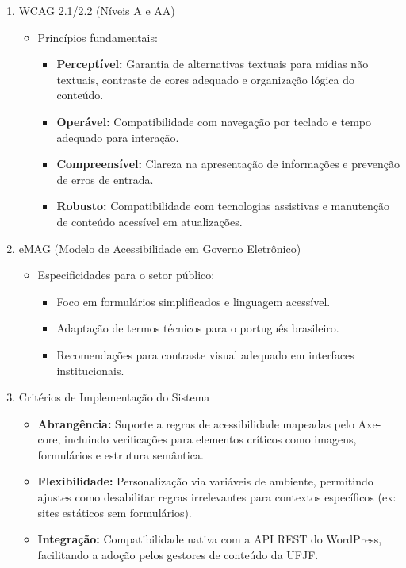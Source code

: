 \documentclass[12pt]{article}
\begin{document}
\begin{enumerate}
    \item WCAG 2.1/2.2 (Níveis A e AA)
    \begin{itemize}
        \item Princípios fundamentais: 
        \begin{itemize}
            \item \textbf{Perceptível:} Garantia de alternativas textuais para mídias não
            textuais, contraste de cores adequado e organização lógica do conteúdo.
            \item \textbf{Operável:} Compatibilidade com navegação por teclado e tempo
            adequado para interação.
            \item \textbf{Compreensível:} Clareza na apresentação de informações e
            prevenção de erros de entrada.
            \item \textbf{Robusto:} Compatibilidade com tecnologias assistivas e
            manutenção de conteúdo acessível em atualizações.
        \end{itemize}
    \end{itemize}
    \item eMAG (Modelo de Acessibilidade em Governo Eletrônico)
    \begin{itemize}
        \item Especificidades para o setor público:
        \begin{itemize}
            \item Foco em formulários simplificados e linguagem acessível.
            \item Adaptação de termos técnicos para o português brasileiro.
            \item Recomendações para contraste visual adequado em interfaces
            institucionais.
        \end{itemize}
    \end{itemize}
    \item Critérios de Implementação do Sistema
    \begin{itemize}
        \item \textbf{Abrangência:} Suporte a regras de acessibilidade mapeadas pelo Axe-core,
        incluindo verificações para elementos críticos como imagens, formulários e
        estrutura semântica.
        \item \textbf{Flexibilidade:} Personalização via variáveis de ambiente, permitindo ajustes
        como desabilitar regras irrelevantes para contextos específicos (ex: sites
        estáticos sem formulários).
        \item \textbf{Integração:} Compatibilidade nativa com a API REST do WordPress, facilitando
        a adoção pelos gestores de conteúdo da UFJF.\@
    \end{itemize}
\end{enumerate}
\end{document}
